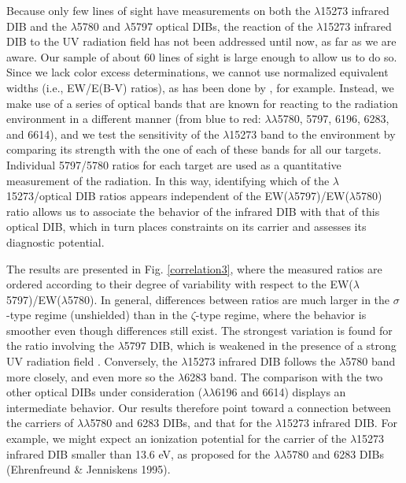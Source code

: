 \documentclass[printer]{aa} %
\begin{document}
Because only few lines of sight have measurements on both the $\lambda$15273 infrared DIB and the $\lambda$5780 and $\lambda$5797 optical DIBs, the reaction of the $\lambda$15273 infrared DIB to the UV radiation field has not been addressed until now, as
far as we are aware. Our sample of about 60 lines of sight is large enough to allow us to do so. Since we lack color excess determinations, we cannot use normalized equivalent widths (i.e., EW/E(B-V) ratios), as has been done by \cite{Cami97},
for example. Instead, we make use of a series of optical bands that are known for reacting to the radiation environment in a  different manner (from blue to red: $\lambda\lambda$5780, 5797, 6196, 6283, and 6614), and we test the sensitivity of the $\lambda$15273 band to the environment by comparing its strength with the one of each of these bands for all our targets. Individual 5797/5780 ratios for each target are used as a quantitative measurement of the radiation. In this way, identifying which of the $\lambda$15273/optical DIB ratios appears independent of the EW($\lambda$5797)/EW($\lambda$5780) ratio allows us to associate the behavior of the infrared DIB with that of this optical DIB, which in turn places constraints on its carrier and assesses its diagnostic potential. 

The results are presented in Fig. \ref{correlation3}, where the measured ratios are ordered according to their degree of variability with respect to the EW($\lambda$5797)/EW($\lambda$5780).
In general, differences between ratios are much larger in the $\sigma$-type regime (unshielded) than  in the $\zeta$-type regime, where the behavior is smoother even though differences still exist.
The strongest variation is found for the ratio involving the $\lambda$5797 DIB, which is weakened in the presence of a strong UV radiation field \citep{Ehrenfreund95,Cami97}.
Conversely, the $\lambda$15273 infrared DIB follows the $\lambda$5780 band more closely, and even more so the $\lambda$6283 band. The comparison with the two other optical DIBs under consideration ($\lambda\lambda$6196 and 6614) displays an intermediate behavior. Our results therefore point toward a connection between the carriers of $\lambda\lambda$5780 and 6283 DIBs, and that for the $\lambda$15273 infrared DIB. For example, we might expect an ionization potential for the carrier of the $\lambda$15273 infrared DIB smaller than 13.6 eV, as proposed for the $\lambda\lambda$5780 and 6283 DIBs (Ehrenfreund \& Jenniskens 1995). 
\end{document}
